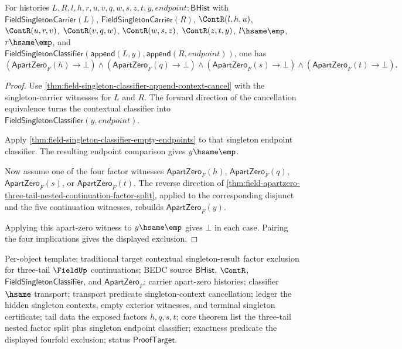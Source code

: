 \begin{theorem}
\label{thm:field-apartzero-three-tail-contextual-singleton-result-exclusion}
For histories $L,R,l,h,r,u,v,q,w,s,z,t,y,endpoint:\mathsf{BHist}$ with
$\mathsf{FieldSingletonCarrier}(L)$, $\mathsf{FieldSingletonCarrier}(R)$,
$\ContR(l,h,u)$, $\ContR(u,r,v)$, $\ContR(v,q,w)$, $\ContR(w,s,z)$,
$\ContR(z,t,y)$, $l\hsame\emp$, $r\hsame\emp$, and
$\mathsf{FieldSingletonClassifier}(\mathsf{append}(L,y),\mathsf{append}(R,endpoint))$,
one has
$$
(\mathsf{ApartZero}_F(h)\to\bot)
\land
(\mathsf{ApartZero}_F(q)\to\bot)
\land
(\mathsf{ApartZero}_F(s)\to\bot)
\land
(\mathsf{ApartZero}_F(t)\to\bot).
$$
\end{theorem}
\begin{proof}
Use \autoref{thm:field-singleton-classifier-append-context-cancel} with the
singleton-carrier witnesses for $L$ and $R$. The forward direction of the
cancellation equivalence turns the contextual classifier into
$\mathsf{FieldSingletonClassifier}(y,endpoint)$.

Apply \autoref{thm:field-singleton-classifier-empty-endpoints} to that
singleton endpoint classifier. The resulting endpoint comparison gives
$y\hsame\emp$.

Now assume one of the four factor witnesses
$\mathsf{ApartZero}_F(h)$, $\mathsf{ApartZero}_F(q)$,
$\mathsf{ApartZero}_F(s)$, or $\mathsf{ApartZero}_F(t)$. The reverse direction
of
\autoref{thm:field-apartzero-three-tail-nested-continuation-factor-split},
applied to the corresponding disjunct and the five continuation witnesses,
rebuilds $\mathsf{ApartZero}_F(y)$.

Applying this apart-zero witness to $y\hsame\emp$ gives $\bot$ in each case.
Pairing the four implications gives the displayed exclusion.
\end{proof}

Per-object template: traditional target contextual singleton-result factor
exclusion for three-tail $\FieldUp$ continuations; BEDC source
$\mathsf{BHist}$, $\ContR$, $\mathsf{FieldSingletonClassifier}$, and
$\mathsf{ApartZero}_F$; carrier apart-zero histories; classifier $\hsame$
transport; transport predicate singleton-context cancellation; ledger the
hidden singleton contexts, empty exterior witnesses, and terminal singleton
certificate; tail data the exposed factors $h,q,s,t$; core theorem list the
three-tail nested factor split plus singleton endpoint classifier; exactness
predicate the displayed fourfold exclusion; status $\mathsf{ProofTarget}$.

